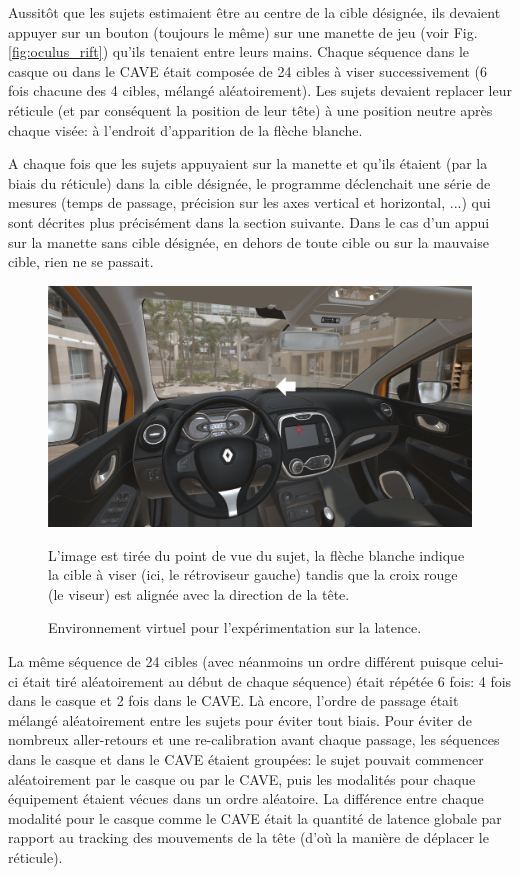 	\par Aussitôt que les sujets estimaient être au centre de la cible désignée, ils devaient appuyer sur un bouton (toujours le même) sur une manette de jeu (voir Fig. \ref{fig:oculus_rift}) qu'ils tenaient entre leurs mains. Chaque séquence dans le casque ou dans le CAVE était composée de 24 cibles à viser successivement (6 fois chacune des 4 cibles, mélangé aléatoirement). Les sujets devaient replacer leur réticule (et par conséquent la position de leur tête) à une position neutre après chaque visée: à l'endroit d'apparition de la flèche blanche.
	
	\par A chaque fois que les sujets appuyaient sur la manette et qu'ils étaient (par la biais du réticule) dans la cible désignée, le programme déclenchait une série de mesures (temps de passage, précision sur les axes vertical et horizontal, ...) qui sont décrites plus précisément dans la section suivante. Dans le cas d'un appui sur la manette sans cible désignée, en dehors de toute cible ou sur la mauvaise cible, rien ne se passait.
	
	\begin{figure}
		\centering
		\includegraphics[scale=.9]{Figures/ExpeLatency}
		\caption{Environnement virtuel pour l'expérimentation sur la latence.}{L'image est tirée du point de vue du sujet, la flèche blanche indique la cible à viser (ici, le rétroviseur gauche) tandis que la croix rouge (le viseur) est alignée avec la direction de la tête.}
		\label{fig:apparatus_latency}
	\end{figure}
	
	\par La même séquence de 24 cibles (avec néanmoins un ordre différent puisque celui-ci était tiré aléatoirement au début de chaque séquence) était répétée 6 fois: 4 fois dans le casque et 2 fois dans le CAVE. Là encore, l'ordre de passage était mélangé aléatoirement entre les sujets pour éviter tout biais. Pour éviter de nombreux aller-retours et une re-calibration avant chaque passage, les séquences dans le casque et dans le CAVE étaient groupées: le sujet pouvait commencer aléatoirement par le casque ou par le CAVE, puis les modalités pour chaque équipement étaient vécues dans un ordre aléatoire. La différence entre chaque modalité pour le casque comme le CAVE était la quantité de latence globale par rapport au tracking des mouvements de la tête (d'où la manière de déplacer le réticule).
	
